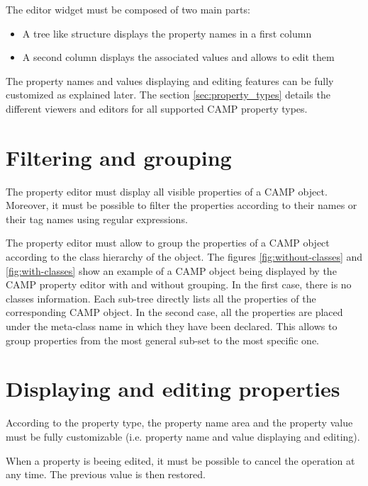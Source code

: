 \documentclass[a4paper, twoside]{report}
\begin{document}
The editor widget must be composed of two main parts:
\begin{itemize}
    \item A tree like structure displays the property names in a first column
    \item A second column displays the associated values and allows to edit them
\end{itemize}

The property names and values displaying and editing features can be fully customized as explained
later. The section \ref{sec:property_types} details the different viewers and editors for all supported
CAMP property types.

\section{Filtering and grouping}

The property editor must display all visible properties of a CAMP object. Moreover, it must be possible
to filter the properties according to their names or their tag names using regular expressions.

The property editor must allow to group the properties of a CAMP object according to the class
hierarchy of the object. The figures \ref{fig:without-classes} and \ref{fig:with-classes} show an
example of a CAMP object being displayed by the CAMP property editor with and without grouping. In
the first case, there is no classes information. Each sub-tree directly lists all the properties of the
corresponding CAMP object. In the second case, all the properties are placed under the meta-class
name in which they have been declared. This allows to group properties from the most general sub-set to the
most specific one.


\section{Displaying and editing properties}

According to the property type, the property name area and the property value must be fully
customizable (i.e. property name and value displaying and editing).

When a property is beeing edited, it must be possible to cancel the operation at any time. The
previous value is then restored.
\end{document}
